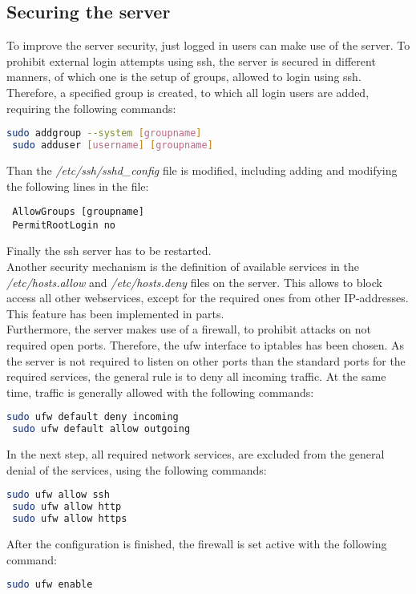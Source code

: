 \subsection{Securing the server}
To improve the server security, just logged in users can make use of the server. To prohibit external login attempts using ssh, the server is secured in different manners, of which 
one is the setup of groups, allowed to login using ssh. Therefore, a specified group is created, to which all login users are added, requiring the following commands:
\begin{lstlisting}[language=bash]
 sudo addgroup --system [groupname]
 sudo adduser [username] [groupname]
\end{lstlisting}
Than the \emph{/etc/ssh/sshd\_config} file is modified, including adding and modifying the following lines in the file:
\begin{lstlisting}
 AllowGroups [groupname]
 PermitRootLogin no
\end{lstlisting}
Finally the ssh server has to be restarted.\\
Another security mechanism is the definition of available services in the \emph{/etc/hosts.allow} and \emph{/etc/hosts.deny} files on the server. This allows to block access all other 
webservices, except for the required ones from other IP-addresses. This feature has been implemented in parts.\\
Furthermore, the server makes use of a firewall, to prohibit attacks on not required open ports. Therefore, the ufw interface to iptables has been chosen. As the server is not 
required to listen on other ports than the standard ports for the required services, the general rule is to deny all incoming traffic. At the same time, traffic is generally 
allowed with the following commands:
\begin{lstlisting}[language=bash]
 sudo ufw default deny incoming
 sudo ufw default allow outgoing
\end{lstlisting}
In the next step, all required network services, are excluded from the general denial of the services, using the following commands:
\begin{lstlisting}[language=bash]
 sudo ufw allow ssh
 sudo ufw allow http
 sudo ufw allow https
\end{lstlisting}
After the configuration is finished, the firewall is set active with the following command:
\begin{lstlisting}[language=bash]
 sudo ufw enable
\end{lstlisting}

